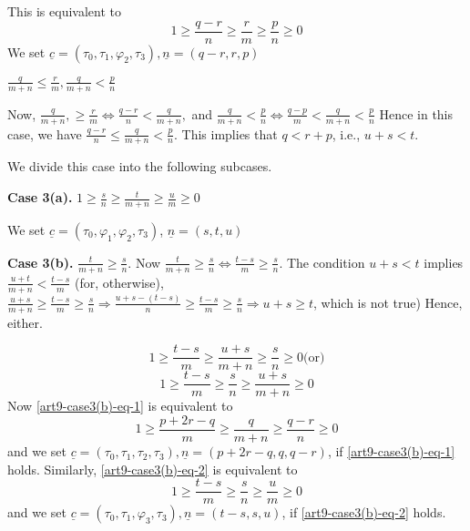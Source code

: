 This is equivalent to
$$
1 \geq \frac{q-r}{n} \geq \frac{r}{m} \geq \frac{p}{n} \geq 0
$$
We set $\underline{c}= (\tau_{0}, \tau_{1}, \varphi_{2}, \tau_{3}), \underline{n}= (q-r,r,p)$

\begin{case}\label{art9-subsec8.3-case-3}
$\frac{q}{m+n} \leq \frac{r}{m}, \frac{q}{m+n} < \frac{p}{n}$

Now, $\frac{q}{m+n}, \geq \frac{r}{m} \Longleftrightarrow \frac{q-r}{n} < \frac{q}{m+n},$ and $\frac{q}{m+n} < \frac{p}{n} \Longleftrightarrow \frac{q-p}{m} < \frac{q}{m+n} < \frac{p}{n}$ Hence in this case, we have $\frac{q-r}{n} \leq \frac{q}{m+n} < \frac{p}{n}$. This implies that $ q< r+p$, i.e., $u+ s< t$.

We divide this case into the following subcases.
\end{case}

\noindent
{\bf Case 3(a).} $1 \geq \frac{s}{n} \geq \frac{t}{m+n}\geq \frac{u}{m} \geq 0$

We set $\underline{c}= (\tau_{0},\varphi_{1}, \varphi_{2},\tau_{3})$, $\underline{n}=(s,t,u)$

\noindent
{\bf Case 3(b).} $\frac{t}{m+n} \geq \frac{s}{n}$. Now $\frac{t}{m+n} \geq \frac{s}{n} \Longleftrightarrow \frac{t-s}{m} \geq \frac{s}{n}$. The condition $u + s< t$ implies $\frac{u+t}{m+n} < \frac{t-s}{m}$ (for, otherwise), $\frac{u+s}{m+n} \geq \frac{t-s}{m} \geq \frac{s}{n} \Rightarrow \frac{u+s-(t-s)}{n} \geq \frac{t-s}{m} \geq \frac{s}{n} \Rightarrow u+s \geq t$, which is not true) Hence, either.

\setcounter{equation}{0}
\begin{equation}\label{art9-case3(b)-eq-1}
1 \geq \frac{t-s}{m} \geq \frac{u+s}{m+n} \geq \frac{s}{n} \geq 0 \text{(or)}
\end{equation}
\begin{equation}\label{art9-case3(b)-eq-2}
1 \geq \frac{t-s}{m} \geq \frac{s}{n} \geq \frac{u+s}{m+n} \geq 0
\end{equation}
Now \eqref{art9-case3(b)-eq-1} is equivalent to
$$
1 \geq \frac{p+2r-q}{m} \geq \frac{q}{m+n} \geq \frac{q-r}{n} \geq 0
$$
and we set $\underline{c}= (\tau_{0}, \tau_{1}, \tau_{2},\tau_{3}), \underline{n}=(p+2r-q, q, q-r)$,
if \eqref{art9-case3(b)-eq-1} holds. Similarly, \eqref{art9-case3(b)-eq-2} is equivalent to
$$
1 \geq \frac{t-s}{m} \geq \frac{s}{n} \geq \frac{u}{m} \geq 0
$$
and we set $\underline{c}= (\tau_{0}, \tau_{1},\varphi_{3}, \tau_{3}), \underline{n}=(t-s,s,u)$,
if \eqref{art9-case3(b)-eq-2} holds.

